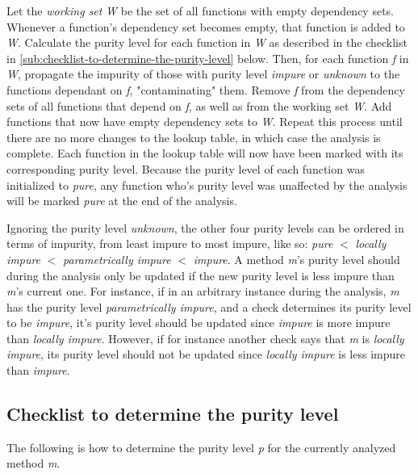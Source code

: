 \documentclass[a4paper,12pt]{article}
\begin{document}
Let the \textit{working set} \textit{W} be the set of all functions with empty dependency sets. Whenever a function's dependency set becomes empty, that function is added to \textit{W}. Calculate the purity level for each function in \textit{W} as described in the checklist in \autoref{sub:checklist-to-determine-the-purity-level} below. Then, for each function \textit{f} in \textit{W}, propagate the impurity of those with purity level \textit{impure} or \textit{unknown} to the functions dependant on \textit{f}, "contaminating" them. Remove \textit{f} from the dependency sets of all functions that depend on \textit{f}, as well as from the working set \textit{W}. Add functions that now have empty dependency sets to \textit{W}. Repeat this process until there are no more changes to the lookup table, in which case the analysis is complete. Each function in the lookup table will now have been marked with its corresponding purity level. Because the purity level of each function was initialized to \textit{pure}, any function who's purity level was unaffected by the analysis will be marked \textit{pure} at the end of the analysis.

Ignoring the purity level \textit{unknown}, the other four purity levels can be ordered in terms of impurity, from least impure to most impure, like so: \textit{pure} $<$ \textit{locally impure} $<$ \textit{parametrically impure} $<$ \textit{impure}. A method \textit{m}'s purity level should during the analysis only be updated if the new purity level is less impure than \textit{m}'s current one. For instance, if in an arbitrary instance during the analysis, \textit{m} has the purity level \textit{parametrically impure}, and a check determines its purity level to be \textit{impure}, it's purity level should be updated since \textit{impure} is more impure than \textit{locally impure}. However, if for instance another check says that \textit{m} is \textit{locally impure}, its purity level should not be updated since \textit{locally impure} is less impure than \textit{impure}.

\subsection{Checklist to determine the purity level} \label{sub:checklist-to-determine-the-purity-level}

The following is how to determine the purity level \textit{p} for the currently analyzed method \textit{m}.
\end{document}
